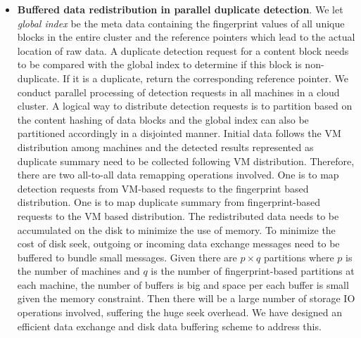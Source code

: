 \begin{itemize}
\item {\bf Buffered data redistribution in parallel duplicate detection}.  
We let {\em global index} be the meta data containing the fingerprint values of all unique blocks
in the entire cluster and  the reference pointers which lead to the actual location of raw data.
A duplicate detection request for a content block needs to be compared with the global index to determine if this
block is non-duplicate. If it is a duplicate, return the corresponding reference pointer.
We conduct parallel processing of detection requests in all machines in a cloud cluster.
A logical way to distribute detection requests is to partition based on the content  hashing of data blocks
and the global index can also be partitioned accordingly in a  disjointed manner.
Initial data follows the VM distribution among machines and the detected results 
represented as  duplicate summary need to be collected following VM distribution. 
Therefore, there are two all-to-all data remapping operations involved.
One is to map detection requests from VM-based requests to the fingerprint based distribution.  
One is to map duplicate summary from fingerprint-based requests to the VM based distribution.  
The redistributed data needs to be accumulated on the disk to minimize the use of memory.
To minimize the cost of disk seek, outgoing or incoming data exchange messages need to be buffered to bundle small messages.
Given there are $p\times q$ partitions where $p$ is the number of machines and $q$ is the number of fingerprint-based partitions
at each machine, the number of buffers is big and space per each buffer  is small given the memory constraint.
Then there will be a large number of storage  IO operations involved, suffering the huge seek overhead.
We have designed an efficient data exchange and disk data buffering  scheme to address this.


\end{itemize}


